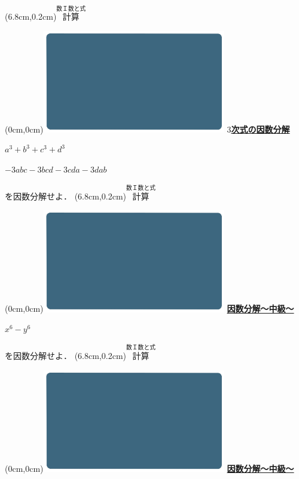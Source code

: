 \documentclass[10pt,
fleqn,
dvipdfmx,
uplatex
]{jsarticle}
\begin{document}
\at(6.8cm,0.2cm){\small\color{bradorange}$\overset{\text{数Ｉ数と式}}{\text{計算}}$}

\newpage

\at(0cm,0cm){\includegraphics[width=8cm,bb=0 0 1920 1080]{./youtube/thumbnails/templates/smart_background/数I数と式.jpeg}}
{\color{orange}\bf\boldmath\huge\underline{$3$次式の因数分解}}\vspace{0.5zw}

\LARGE 
\bf\boldmath $a^3+b^3+c^3+d^3$

\Large
\hfill $-3abc-3bcd-3cda-3dab$

\Large
\vspace{1zw}
\hfill を因数分解せよ．
\at(6.8cm,0.2cm){\small\color{bradorange}$\overset{\text{数Ｉ数と式}}{\text{計算}}$}

\newpage

\at(0cm,0cm){\includegraphics[width=8cm,bb=0 0 1920 1080]{./youtube/thumbnails/templates/smart_background/数I数と式.jpeg}}
{\color{orange}\bf\boldmath\huge\underline{因数分解〜中級〜}}\vspace{0.5zw}

\fontsize{50}{0} \selectfont
\bf\boldmath 
\hspace{0.5zw}$x^6-y^6$

\Large
\vspace{1zw}
\hfill を因数分解せよ．
\at(6.8cm,0.2cm){\small\color{bradorange}$\overset{\text{数Ｉ数と式}}{\text{計算}}$}

\newpage

\at(0cm,0cm){\includegraphics[width=8cm,bb=0 0 1920 1080]{./youtube/thumbnails/templates/smart_background/数I数と式.jpeg}}
{\color{orange}\bf\boldmath\huge\underline{因数分解〜中級〜}}\vspace{0.5zw}
\end{document}
